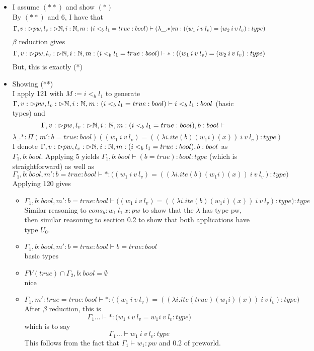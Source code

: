 \documentclass{article}
\begin{document}
     \begin{itemize}
         \item I assume $(**)$ and show $(*)$\\
         By $(**)$ and 6, I have that 
         \[\Gamma, v: \rhd pw, l_v: \rhd \mathbb{N}, i: \mathbb{N}, m: (i <_b l_1 = true : bool)  \vdash  (\lambda \_.*) m : ((w_1 \: i \: v \: l_v) = (w_2 \: i \: v \: l_v) : type)
     \]
     $\beta$ reduction gives
       \[\Gamma, v: \rhd pw, l_v: \rhd \mathbb{N}, i: \mathbb{N}, m: (i <_b l_1 = true : bool)  \vdash  * : ((w_1 \: i \: v \: l_v) = (w_2 \: i \: v \: l_v) : type)
     \]
     But, this is exactly (*)
     \item Showing (**)\\
     I apply 121 with $M := i <_b l_1$ to generate\\
     $\Gamma, v: \rhd pw, l_v: \rhd \mathbb{N}, i: \mathbb{N}, m: (i <_b l_1 = true : bool)  \vdash i <_b l_1: bool$ (basic types) and 
   \[\Gamma, v: \rhd pw, l_v: \rhd \mathbb{N}, i: \mathbb{N}, m: (i <_b l_1 = true : bool), b: bool  \vdash \] 
   \[\lambda \_.* : \Pi(m' : b = true : bool)((w_1 \: i \: v \: l_v) = ((\lambda i. ite (b) (w_1 i) (x)) \: i \: v \: l_v) : type)
     \]
     I denote $\Gamma, v: \rhd pw, l_v: \rhd \mathbb{N}, i: \mathbb{N}, m: (i <_b l_1 = true : bool), b: bool$ as $\Gamma_1, b: bool$.
     Applying 5 yields $\Gamma_1, b: bool \vdash (b = true) : bool : type$ (which is straightforward) as well as
     \[\Gamma_1, b: bool, m' : b = true : bool \vdash * : \big((w_1 \: i \: v \: l_v) = ((\lambda i. ite (b) (w_1 i) (x)) \: i \: v \: l_v) : type \big) \] 
         Applying 120 gives 
         \begin{itemize}
             \item $\Gamma_1, b: bool, m' : b = true : bool \vdash 
             \big((w_1 \: i \: v \: l_v) = ((\lambda i. ite (b) (w_1 i) (x)) \: i \: v \: l_v) : type \big) : type
             $\\
             Similar reasoning to $cons_b: w_1 \:l_1\:x : pw$ to show that the $\lambda$ has type pw, then similar reasoning to section 0.2 
             to show that both applications have type $U_0$.
             \item  $\Gamma_1, b: bool, m' : b = true : bool \vdash b = true : bool$\\
             basic types
             \item $FV(true) \cap \Gamma_2, b: bool = \emptyset$\\
             nice
             \item \[\Gamma_1, m' : true = true : bool \vdash 
             * : \big((w_1 \: i \: v \: l_v) = ((\lambda i. ite (true) (w_1 i) (x)) \: i \: v \: l_v) : type \big)
             \]
             After $\beta$ reduction, this is 
             \[\Gamma_1 \dots \vdash 
             * : \big(w_1 \: i \: v \: l_v =  w_1 i \: v \: l_v : type \big)
             \]
             which is to say 
             \[\Gamma_1 \dots \vdash  w_1 \: i \: v \: l_v: type
             \]
             This follows from the fact that $\Gamma_1 \vdash w_1: pw$ and 0.2 of preworld.
         \end{itemize}
     \end{itemize}
     
\end{document}
